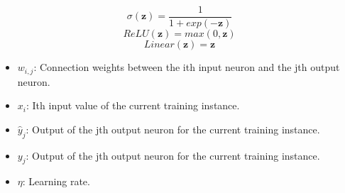 \documentclass[12pt]{article}
\begin{document}
\begin{multicols}{3}
	\noindent
	\begin{equation}
		\sigma(\textbf{z})=\frac{1}{1+ exp(-\textbf{z})}
		\label{logistic-activation-function}
	\end{equation}
	\begin{equation}
		ReLU(\textbf{z}) = max(0,\textbf{z})
		\label{relu-activation-function}
	\end{equation}
	\begin{equation}
		Linear(\textbf{z}) = \textbf{z}
		\label{linear-activation-function}
	\end{equation}
\end{multicols}
\singlespacing
\begin{itemize}
	\item $w_{i,j}$: Connection weights between the ith input neuron and the jth output neuron.
	\item $x_i$: Ith input value of the current training instance.
	\item $\hat{y}_{j}$: Output of the jth output neuron for the current training instance.
	\item $y_{j}$: Output of the jth output neuron for the current training instance.
	\item $\eta$: Learning rate.
\end{itemize}
\doublespacing
\end{document}
